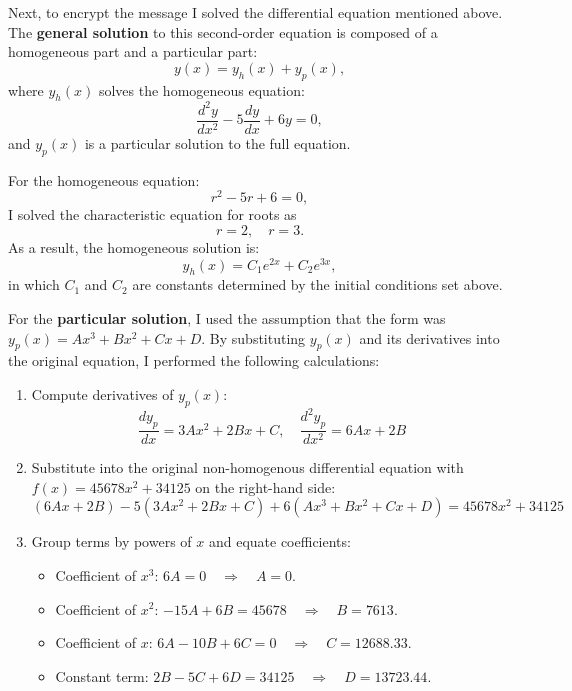 \documentclass[12pt]{article}
\begin{document}

Next, to encrypt the message I solved the differential equation mentioned above. The \textbf{general solution} to this second-order equation is composed of a homogeneous part and a particular part:
\[
y(x) = y_h(x) + y_p(x),
\]
\centering where \( y_h(x) \) solves the homogeneous equation:
\[
\frac{d^2y}{dx^2} - 5\frac{dy}{dx} + 6y = 0,
\]
and \( y_p(x) \) is a particular solution to the full equation.

\vspace{0.1in}

For the homogeneous equation:
\[
r^2 - 5r + 6 = 0,
\]
I solved the characteristic equation for roots as
\[
r = 2, \quad r = 3.
\]
As a result, the homogeneous solution is:
\[
y_h(x) = C_1e^{2x} + C_2e^{3x},
\]
in which \( C_1 \) and \( C_2 \) are constants determined by the initial conditions set above.

\raggedright
\setlength{\parindent}{0.5in} %

\vspace{0.1in}


For the \textbf{particular solution}, I used the assumption that the form was \( y_p(x) = Ax^3 + Bx^2 + Cx + D \). By substituting \( y_p(x) \) and its derivatives into the original equation, I performed the following calculations:

\begin{enumerate}
    \item Compute derivatives of \( y_p(x) \):
    \[
    \frac{dy_p}{dx} = 3Ax^2 + 2Bx + C, \quad \frac{d^2y_p}{dx^2} = 6Ax + 2B
    \]

    \item Substitute into the original non-homogenous differential equation with \( f(x) = 45678x^2 + 34125 \) on the right-hand side:
    \[
    (6Ax + 2B) - 5(3Ax^2 + 2Bx + C) + 6(Ax^3 + Bx^2 + Cx + D) = 45678x^2 + 34125
    \]

    \item Group terms by powers of \( x \) and equate coefficients:
    \begin{itemize}
        \item Coefficient of \( x^3 \): \( 6A = 0 \quad \Rightarrow \quad A = 0. \)
        \item Coefficient of \( x^2 \): \( -15A + 6B = 45678 \quad \Rightarrow \quad B = 7613. \)
        \item Coefficient of \( x \): \( 6A - 10B + 6C = 0 \quad \Rightarrow \quad C = 12688.33. \)
        \item Constant term: \( 2B - 5C + 6D = 34125 \quad \Rightarrow \quad D = 13723.44. \)
    \end{itemize}
\end{enumerate}
\end{document}
